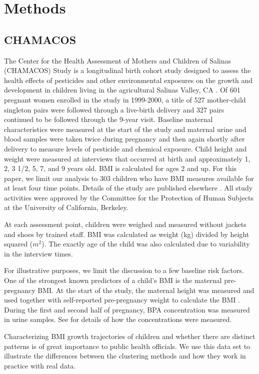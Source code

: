 \section{Methods}
\subsection{CHAMACOS}
The Center for the Health Assessment of Mothers and Children of Salinas (CHAMACOS) Study is a longitudinal birth cohort study designed to assess the health effects of pesticides and other environmental exposures on the growth and development in children living in the agricultural Salinas Valley, CA \cite{eskenazi2004,eskenazi2005}. Of 601 pregnant women enrolled in the study in 1999-2000, a title of 527 mother-child singleton pairs were followed through a live-birth delivery and 327 pairs continued to be followed through the 9-year visit. Baseline maternal characteristics were measured at the start of the study and maternal urine and blood samples were taken twice during pregnancy and then again shortly after delivery to measure levels of pesticide and chemical exposure. Child height and weight  were measured at interviews that occurred at birth and approximately 1, 2, 3 1/2, 5, 7, and 9 years old. BMI is calculated for ages 2 and up. For this paper, we limit our analysis to 303 children who have BMI measures available for at least four time points. Details of the study are published elsewhere \cite{eskenazi2003}. All study activities were approved by the Committee for the Protection of Human Subjects at the University of California, Berkeley. 

At each assessment point, children were weighed and measured without jackets and shoes by trained staff. BMI was calculated as weight (kg) divided by height squared ($m^{2}$). The exactly age of the child was also calculated due to variability in the interview times.

For illustrative purposes, we limit the discussion to a few baseline risk factors. One of the strongest known predictors of a child's BMI is the maternal pre-pregnancy BMI. At the start of the study, the maternal height was measured and used together with self-reported pre-pregnancy weight to calculate the BMI . During the first and second half of pregnancy, BPA concentration was measured in urine samples. See \textcite{harley2013} for details of how the concentrations were measured.

Characterizing BMI growth trajectories of children and whether there are distinct patterns is of great importance to public health officials. We use this data set to illustrate the differences between the clustering methods and how they work in practice with real data.

